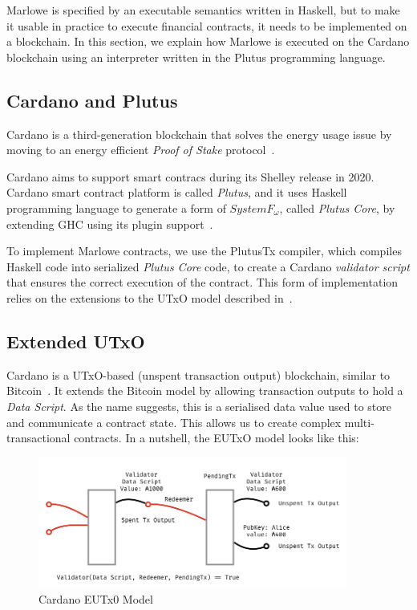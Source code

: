 \documentclass[runningheads]{llncs}
\begin{document}
Marlowe is specified by an executable semantics written in Haskell, but to make it usable in practice to execute financial contracts, it needs to be implemented on a blockchain. In this section, we explain how Marlowe is executed on the Cardano blockchain using an interpreter written in the Plutus programming language.

\subsection{Cardano and Plutus}

Cardano is a third-generation blockchain that solves the energy usage
issue by moving to an energy efficient \emph{Proof of Stake} protocol~\cite{Ouroboros-Genesis}.

Cardano aims to support smart contracs during its Shelley release in 2020.
Cardano smart contract platform is called \emph{Plutus}, and
it uses Haskell programming language to generate a form of $System F_{\omega}$,
called \emph{Plutus Core}, by extending GHC using its plugin
support~\cite[Section 13.3]{ghcusersguide}.

To implement Marlowe contracts, we use the PlutusTx compiler,
which compiles Haskell code into serialized \emph{Plutus Core} code,
to create a Cardano \emph{validator script} that ensures the correct execution of the contract.
This form of implementation relies on the extensions to the UTxO model described in~\cite{PlutusPlatform}.


\subsection{Extended UTxO}

Cardano is a UTxO-based (unspent transaction output) blockchain, similar to Bitcoin~\cite{sok}.
It extends the Bitcoin model by allowing transaction outputs to hold a \emph{Data Script}.
As the name suggests, this is  a serialised data value used to store and communicate a contract state.
This allows us to create complex multi-transactional contracts.
In a nutshell, the EUTxO model looks like this:

\begin{figure}[!h]
    \centering
    \includegraphics[width=4in]{figures/Marlowe3-Figures-003.jpeg}
    \caption{Cardano EUTx0 Model}
    \label{fig:eutxo}
\end{figure}
\end{document}
